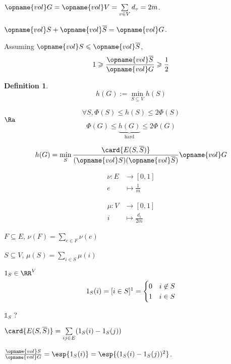 \documentclass[12pt]{article}
\newtheorem{definition}[lemma]{Definition}
\begin{document}
$\opname{vol} G = \opname{vol} V = \sum\limits_{v\in V} d_v = 2m$.

$\opname{vol} S + \opname{vol} \overline{S} = \opname{vol} G$.

Assuming $\opname{vol} S \leqslant \opname{vol} \overline{S}$,
\[
    1 \geqslant \frac{\opname{vol} \overline{S}}{\opname{vol} G} \geqslant \frac{1}{2}
\]

\begin{definition}
    \[
        h(G) := \min\limits_{S\subseteq V} h(S)
    \]
\end{definition}

\[
    \forall S, \Phi(S) \leqslant h(S) \leqslant 2 \Phi(S)
\]
$\Ra$
\[
    \Phi(G) \leqslant \underbrace{h(G)}_{\text{hard}} \leqslant 2 \Phi(G)
\]


\[
    h(G) = \min\limits_S \frac{\card{E(S,\overline{S})}}{(\opname{vol} S)(\opname{vol} \overline{S})} \opname{vol} G
\]

\[
    \begin{aligned}
        \nu : E&\to [0,1]\\
        e &\mapsto \frac{1}{m}
    \end{aligned}
\]

\[
    \begin{aligned}
        \mu : V&\to [0,1]\\
        i &\mapsto \frac{d_i}{2m}
    \end{aligned}
\]


$F\subseteq E$, $\nu(F) = \sum\limits_{e\in F} \nu(e)$

$S\subseteq V$, $\mu(S)=\sum\limits_{i\in S} \mu(i)$

\begin{notation}
    $1_S \in \RR^V$
    \[
        1_S(i) = [i\in S]\footnotemark = \begin{cases}
            0 & i\not\in S\\
            1 & i\in S
        \end{cases}         
    \]
    
    $\mathbb{1}_S$ ?
\end{notation}

$\card{E(S,\overline{S})} = \sum\limits_{ij\in E} (1_S(i)-1_S(j))$


$\frac{\opname{vol} S}{\opname{vol} G} = \esp{1_S(i)} = \esp{(1_S(i)-1_S(j))^2}$.
\end{document}
